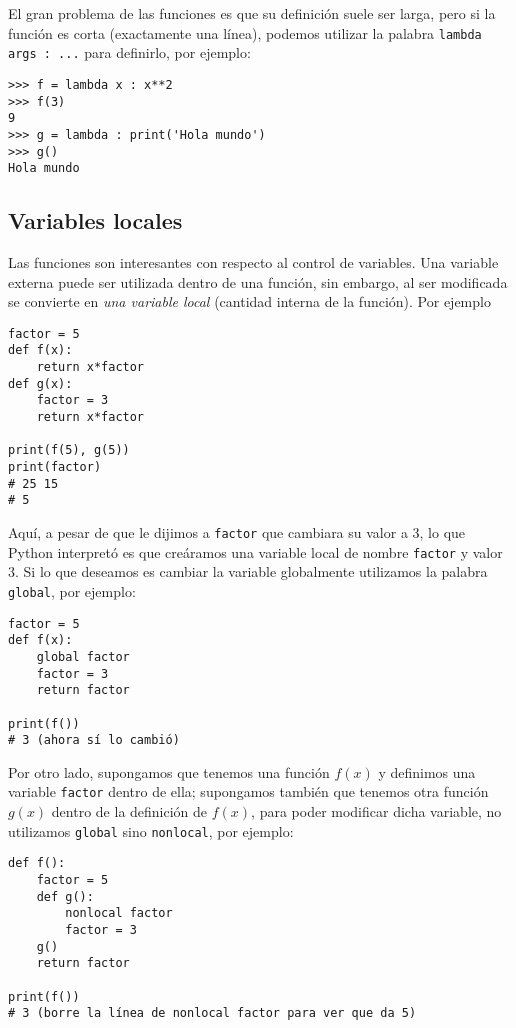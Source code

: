 \documentclass[11pt,twoside]{report}
\begin{document}
El gran problema de las funciones es que su definición suele ser larga, pero si la función es corta (exactamente una línea), podemos utilizar la palabra \lstinline|lambda args : ...| para definirlo, por ejemplo:
\begin{lstlisting}
>>> f = lambda x : x**2
>>> f(3)
9
>>> g = lambda : print('Hola mundo')
>>> g()
Hola mundo
\end{lstlisting}

\subsection{Variables locales}
Las funciones son interesantes con respecto al control de variables. Una variable externa puede ser utilizada dentro de una función, sin embargo, al ser modificada se convierte en \textit{una variable local} (cantidad interna de la función). Por ejemplo
\begin{lstlisting}
factor = 5
def f(x):
    return x*factor
def g(x):
    factor = 3
    return x*factor

print(f(5), g(5))
print(factor)
# 25 15
# 5
\end{lstlisting}
Aquí, a pesar de que le dijimos a \texttt{factor} que cambiara su valor a 3, lo que Python interpretó es que creáramos una variable local de nombre \texttt{factor} y valor 3. Si lo que deseamos es cambiar la variable globalmente utilizamos la palabra \lstinline|global|, por ejemplo:
\begin{lstlisting}
factor = 5
def f(x):
    global factor
    factor = 3
    return factor

print(f())
# 3 (ahora sí lo cambió)
\end{lstlisting}
Por otro lado, supongamos que tenemos una función $f(x)$ y definimos una variable \lstinline|factor| dentro de ella; supongamos también que tenemos otra función $g(x)$ dentro de la definición de $f(x)$, para poder modificar dicha variable, no utilizamos \lstinline|global| sino \lstinline|nonlocal|, por ejemplo:
\begin{lstlisting}
def f():
    factor = 5
    def g():
        nonlocal factor
        factor = 3
    g()
    return factor

print(f())
# 3 (borre la línea de nonlocal factor para ver que da 5)
\end{lstlisting}
\end{document}
